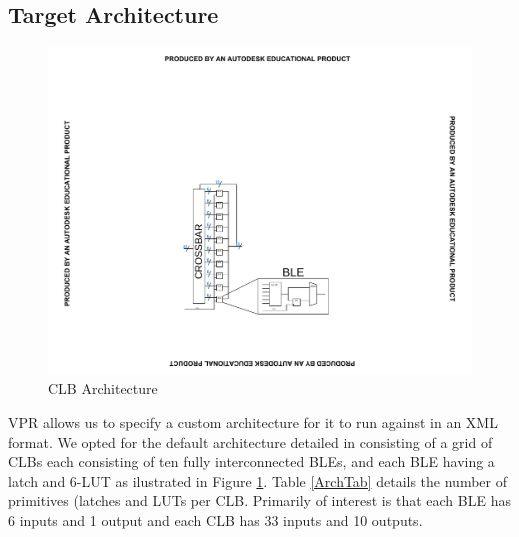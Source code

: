 \documentclass[12pt,final,oneside]{dwThesis} %
\begin{document}
   \subsection{Target Architecture}
   \begin{figure}
      \begin{center}
         \includegraphics[clip,trim=8cm 4cm 8cm 8cm]{images/CLB.pdf}
         \caption{\gls{CLB} Architecture}
         \label{ArchFig}
      \end{center}
   \end{figure}
   \gls{VPR} allows us to specify a custom architecture for it to run against in an XML format. We opted for the default architecture detailed in \cite{VPRManual} consisting of a grid of \glspl{CLB} each consisting of ten fully interconnected \glspl{BLE}, and each \gls{BLE} having a latch and 6-\gls{LUT} as ilustrated in Figure \ref{ArchFig}.
   Table \ref{ArchTab} details the number of primitives (latches and \glspl{LUT} per \gls{CLB}. Primarily of interest is that each \gls{BLE} has 6 inputs and 1 output and each \gls{CLB} has 33 inputs and 10 outputs.


\end{document}
